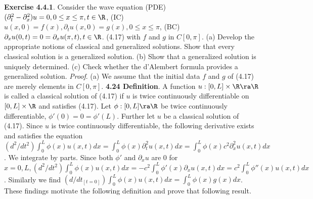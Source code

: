 {\bf Exercise 4.4.1}. Consider the wave equation (PDE) $(\partial_t^2-\partial_x^2)u=0, 0 \leq x \leq \pi, t \in \R$, (IC) $u(x,0)=f(x), \partial_t u(x,0)=g(x), 0\leq x\leq \pi$, (BC) $\partial_xu(0,t)=0=\partial_xu(\pi,t), t \in \R$. (4.17) with $f$ and $g$ in $C[0,\pi]$. (a) Develop the appropriate notions of classical and generalized solutions.  Show that every classical solution is a generalized solution. (b) Show that a generalized solution is uniquely determined. (c) Check whether the d'Alembert formula provides a generalized solution. {\it Proof}. (a) We assume that the initial data $f$ and $g$ of (4.17) are merely elements in $C[0,\pi]$. {\bf 4.24 Definition}. A function $u: [0,L] \times \R \ra \R$ is called a classical solution of (4.17) if $u$ is twice continuously differentiable on $[0,L] \times \R$ and satisfies (4.17). Let $\phi: [0,L] \ra \R$ be twice continuously differentiable, $\phi'(0)=0=\phi'(L)$. Further let $u$ be a classical solution of (4.17). Since $u$ is twice continuously differentiable, the following derivative exists and satisfies the equation $(d^2/dt^2)\int_0^L \phi(x)u(x,t)dx=\int_0^L\phi(x)\partial_t^2u(x,t)dx=\int_0^L\phi(x)c^2\partial_x^2u(x,t)dx$. We integrate by parts. Since both $\phi'$ and $\partial_xu$ are 0 for $x=0,L, (d^2/dt^2)\int_0^L \phi(x)u(x,t)dx=-c^2\int_0^L\phi'(x)\partial_xu(x,t)dx=c^2\int_0^L\phi''(x)u(x,t)dx$. Similarly we find $(d/dt_{[t=0]})\int_0^L\phi(x)u(x,t)dx=\int_0^L\phi(x)g(x)dx$. These findings motivate the following definition and prove that following result.